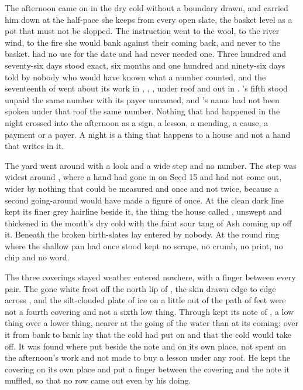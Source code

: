 The afternoon came on in the dry cold without a boundary drawn, and  carried him down  at the half-pace she keeps from every open slate, the basket level as a pot that must not be slopped. The instruction went to the wool, to the river wind, to the fire she would bank against their coming back, and never to the basket.  had no use for the date and had never needed one. Three hundred and seventy-six days stood exact, six months and one hundred and ninety-six days told by nobody who would have known what a number counted, and the seventeenth of  went about its work in , , , under  roof and out in . 's fifth stood unpaid the same number with its payer unnamed, and 's name had not been spoken under that roof the same number. Nothing that had happened in the night crossed into the afternoon as a sign, a lesson, a mending, a cause, a payment or a payer. A night is a thing that happens to a house and not a hand that writes in it.

The yard went around  with a look and a wide step and no number. The step was widest around , where a hand had gone in on Seed 15 and had not come out, wider by nothing that could be measured and once and not twice, because a second going-around would have made a figure of once. At  the clean dark line kept its finer grey hairline beside it, the thing the house called , unswept and thickened in the month's dry cold with the faint sour tang of Ash coming up off it. Beneath  the broken birth-slates lay entered by nobody. At  the round ring where the shallow pan had once stood kept no scrape, no crumb, no print, no chip and no word.

The three coverings stayed weather entered nowhere, with a finger between every pair. The gone white frost off the north lip of , the skin drawn edge to edge across , and the silt-clouded plate of ice on  a little out of the path of feet were not a fourth covering and not a sixth low thing. Through   kept its note of , a low thing over a lower thing, nearer at the going of the water than at its coming; over it from bank to bank lay  that the cold had put on and that the cold would take off. It was found where put beside the note and on its own place, not spent on the afternoon's work and not made to buy a lesson under any roof. He kept the covering on its own place and put a finger between the covering and the note it muffled, so that no row came out even by his doing.

